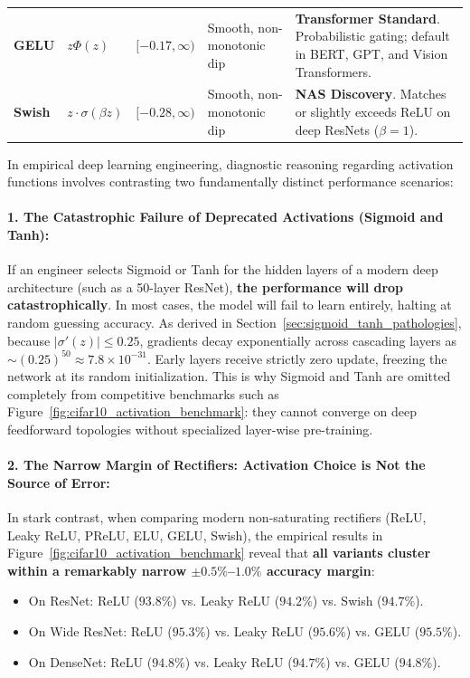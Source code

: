\begin{table}[H]
\begin{tabularx}{\textwidth}{l l c p{3.8cm} X}
\addlinespace
\textbf{GELU} & $z \Phi(z)$ & $[-0.17, \infty)$ & Smooth, non-monotonic dip & \textbf{Transformer Standard}. Probabilistic gating; default in BERT, GPT, and Vision Transformers. \\
\addlinespace
\textbf{Swish} & $z \cdot \sigma(\beta z)$ & $[-0.28, \infty)$ & Smooth, non-monotonic dip & \textbf{NAS Discovery}. Matches or slightly exceeds ReLU on deep ResNets ($\beta = 1$). \\
\bottomrule
\end{tabularx}
\end{table}

In empirical deep learning engineering, diagnostic reasoning regarding activation functions involves contrasting two fundamentally distinct performance scenarios:

\paragraph{1. The Catastrophic Failure of Deprecated Activations (Sigmoid and Tanh):}
If an engineer selects Sigmoid or Tanh for the hidden layers of a modern deep architecture (such as a 50-layer ResNet), \textbf{the performance will drop catastrophically}. In most cases, the model will fail to learn entirely, halting at random guessing accuracy. As derived in Section~\ref{sec:sigmoid_tanh_pathologies}, because $|\sigma'(z)| \le 0.25$, gradients decay exponentially across cascading layers as $\sim (0.25)^{50} \approx 7.8 \times 10^{-31}$. Early layers receive strictly zero update, freezing the network at its random initialization. This is why Sigmoid and Tanh are omitted completely from competitive benchmarks such as Figure~\ref{fig:cifar10_activation_benchmark}: they cannot converge on deep feedforward topologies without specialized layer-wise pre-training.

\paragraph{2. The Narrow Margin of Rectifiers: Activation Choice is Not the Source of Error:}
In stark contrast, when comparing modern non-saturating rectifiers (ReLU, Leaky ReLU, PReLU, ELU, GELU, Swish), the empirical results in Figure~\ref{fig:cifar10_activation_benchmark} reveal that \textbf{all variants cluster within a remarkably narrow $\pm 0.5\%$--$1.0\%$ accuracy margin}:
\begin{itemize}[noitemsep,topsep=2pt,parsep=0pt,partopsep=0pt]
  \item On ResNet: ReLU ($93.8\%$) vs. Leaky ReLU ($94.2\%$) vs. Swish ($94.7\%$).
  \item On Wide ResNet: ReLU ($95.3\%$) vs. Leaky ReLU ($95.6\%$) vs. GELU ($95.5\%$).
  \item On DenseNet: ReLU ($94.8\%$) vs. Leaky ReLU ($94.7\%$) vs. GELU ($94.8\%$).
\end{itemize}

